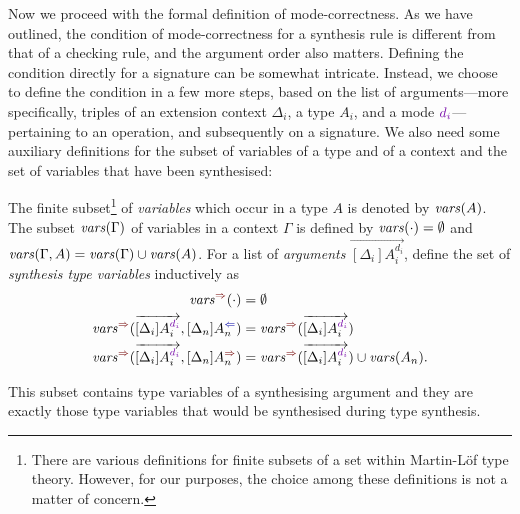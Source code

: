 Now we proceed with the formal definition of mode-correctness.
As we have outlined, the condition of mode-correctness for a synthesis rule is different from that of a checking rule, and the argument order also matters.
Defining the condition directly for a signature can be somewhat intricate.
Instead, we choose to define the condition in a few more steps, based on the list of arguments---more specifically, triples of an extension context $\Delta_i$, a type $A_i$, and a mode $\dir{d_i}$---pertaining to an operation, and subsequently on a signature.
We also need some auxiliary definitions for the subset of variables of a type and of a context and the set of variables that have been synthesised:
\begin{definition}
  The finite subset\footnote{%
  There are various definitions for finite subsets of a set within Martin-L\"{o}f type theory.
  However, for our purposes, the choice among these definitions is not a matter of concern.}
  of \emph{variables} which occur in a type $A$ is denoted by $\mathit{vars}(A)$.
  The subset $\mathit{vars}(\Gamma)$ of variables in a context $\Gamma$ is defined by $\mathit{vars}(\cdot) = \emptyset$ and $\mathit{vars}(\Gamma, A) = \mathit{vars}(\Gamma) \cup \mathit{vars}(A)$.
  For a list of \emph{arguments} $\overrightarrow{[\Delta_i]A_i^{d_i}}$, define the set of \emph{synthesis type variables} inductively as 
  \begin{align}
    \label{eq:synvar1}\synvar(\cdot)                                  & = \emptyset  \\
    \label{eq:synvar2}\synvar(\overrightarrow{[\Delta_i]A_i^{\dir{d_i}}}, [\Delta_{n}] A_{n}^{\dir{\chk}}) & = 
    \synvar(\overrightarrow{[\Delta_i]A_i^{\dir{d_i}}}) \\
    \label{eq:synvar3}\synvar(\overrightarrow{[\Delta_i]A_i^{\dir{d_i}}}, [\Delta_{n}] A_{n}^{\dir{\syn}}) & = 
    \synvar(\overrightarrow{[\Delta_i]A_i^{\dir{d_i}}}) \cup \fv(A_{n}).
  \end{align}
\end{definition}
This subset contains type variables of a synthesising argument and they are exactly those type variables that would be synthesised during type synthesis.

